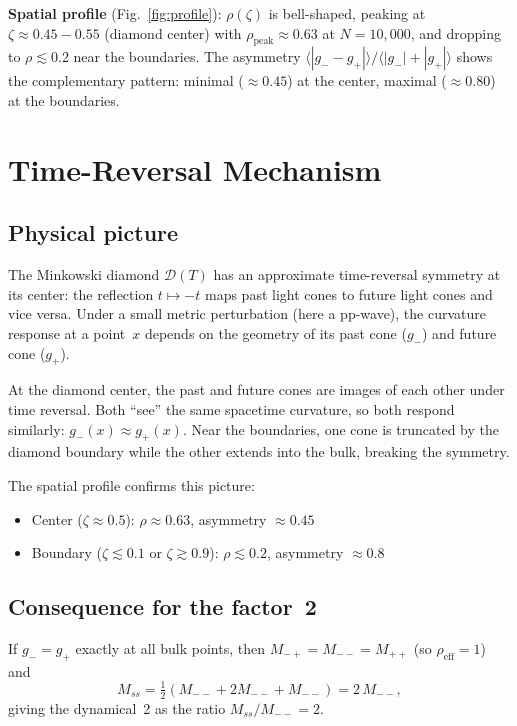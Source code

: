 \documentclass[11pt,a4paper]{article}
\begin{document}
\textbf{Spatial profile} (Fig.~\ref{fig:profile}):
$\rho(\zeta)$ is bell-shaped, peaking at $\zeta \approx 0.45{-}0.55$ (diamond center)
with $\rho_{\mathrm{peak}} \approx 0.63$ at $N = 10{,}000$, and dropping to $\rho \lesssim 0.2$
near the boundaries.  The asymmetry $\langle|g_- - g_+|\rangle/\langle|g_-| + |g_+|\rangle$
shows the complementary pattern: minimal ($\approx 0.45$) at the center, maximal ($\approx 0.80$)
at the boundaries.

\section{Time-Reversal Mechanism}

\subsection{Physical picture}

The Minkowski diamond $\mathcal{D}(T)$ has an approximate time-reversal symmetry at its center:
the reflection $t \mapsto -t$ maps past light cones to future light cones and vice versa.
Under a small metric perturbation (here a pp-wave), the curvature response at a point~$x$
depends on the geometry of its past cone ($g_-$) and future cone ($g_+$).

At the diamond center, the past and future cones are images of each other under time reversal.
Both ``see'' the same spacetime curvature, so both respond similarly: $g_-(x) \approx g_+(x)$.
Near the boundaries, one cone is truncated by the diamond boundary while the other extends
into the bulk, breaking the symmetry.

The spatial profile confirms this picture:
\begin{itemize}
\item Center ($\zeta \approx 0.5$): $\rho \approx 0.63$, asymmetry $\approx 0.45$
\item Boundary ($\zeta \lesssim 0.1$ or $\zeta \gtrsim 0.9$): $\rho \lesssim 0.2$, asymmetry $\approx 0.8$
\end{itemize}

\subsection{Consequence for the factor~2}

If $g_- = g_+$ exactly at all bulk points, then $M_{-+} = M_{--} = M_{++}$ (so $\rho_{\mathrm{eff}} = 1$)
and
\[
  M_{ss} = \tfrac{1}{2}(M_{--} + 2M_{--} + M_{--}) = 2\,M_{--},
\]
giving the dynamical~2 as the ratio $M_{ss}/M_{--} = 2$.
\end{document}
